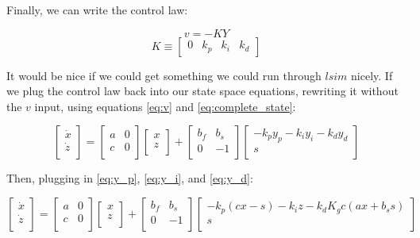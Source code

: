 \documentclass[10pt,letterpaper]{article}
\begin{document}
Finally, we can write the control law:

\[ v = -K Y \]
\[
K \equiv
\begin{bmatrix}
	0 & k_p & k_i & k_d
\end{bmatrix}
\]

It would be nice if we could get something we could run through $lsim$ nicely. If we plug the control law back into our state space equations, rewriting it without the $v$ input, using equations \ref{eq:v} and \ref{eq:complete_state}:

\[
\begin{bmatrix}
    \dot{x} \\
    \dot{z} \\
\end{bmatrix} =
\begin{bmatrix}
	a & 0 \\
	c & 0 \\
\end{bmatrix}
\begin{bmatrix}
	x \\
	z \\
\end{bmatrix} + 
\begin{bmatrix}
	b_f & b_s \\
	0 & -1 \\
\end{bmatrix}
\begin{bmatrix}
	-k_p y_p -k_i y_i - k_d y_d \\
	s \\
\end{bmatrix}
\]

Then, plugging in \ref{eq:y_p}, \ref{eq:y_i}, and \ref{eq:y_d}:

\[
\begin{bmatrix}
    \dot{x} \\
    \dot{z} \\
\end{bmatrix} =
\begin{bmatrix}
	a & 0 \\
	c & 0 \\
\end{bmatrix}
\begin{bmatrix}
	x \\
	z \\
\end{bmatrix} + 
\begin{bmatrix}
	b_f & b_s \\
	0 & -1 \\
\end{bmatrix}
\begin{bmatrix}
	-k_p (cx - s) -k_i z - k_d K_g c (ax + b_s s) \\
	s \\
\end{bmatrix}
\]
\end{document}
